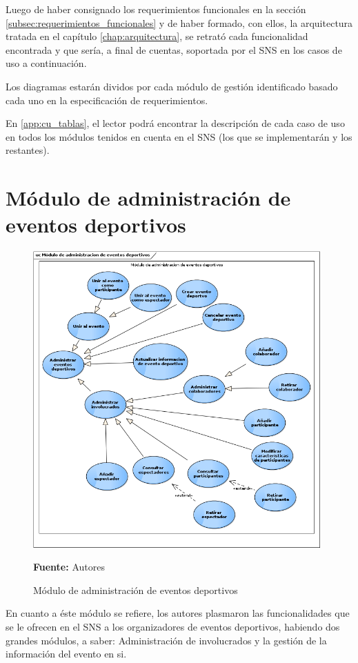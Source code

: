 Luego de haber consignado los requerimientos funcionales en la sección \ref{subsec:requerimientos_funcionales} y de haber formado, con ellos, la arquitectura tratada en el capítulo \ref{chap:arquitectura}, se retrató cada funcionalidad encontrada y que sería, a final de cuentas, soportada por el SNS en los casos de uso a continuación.

Los diagramas estarán dividos por cada módulo de gestión identificado basado cada uno en la especificación de requerimientos.

En \ref{app:cu_tablas}, el lector podrá encontrar la descripción de cada caso de uso en todos los módulos tenidos en cuenta en el SNS (los que se implementarán y los restantes).

\section{Módulo de administración de eventos deportivos}

\begin{figure}[!htb]
  \begin{center}
    \includegraphics[width=11cm]{./imagenes/casos_uso/gestion_evento.png}
    \caption{Módulo de administración de eventos deportivos}
    \label{fig:cu_admin_eve}
    \textbf{Fuente:} Autores
  \end{center}
\end{figure}

En cuanto a éste módulo se refiere, los autores plasmaron las funcionalidades que se le ofrecen en el SNS a los organizadores de eventos deportivos, habiendo dos grandes módulos, a saber: Administración de involucrados y la gestión de la información del evento en si.

